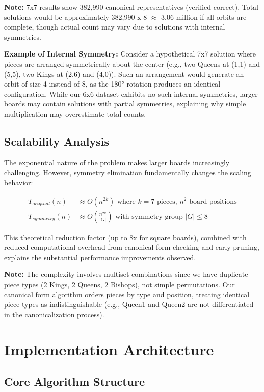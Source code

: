 \documentclass[12pt,a4paper]{article}
\theoremstyle{definition}
\begin{document}
\textbf{Note:} 7x7 results show 382,990 canonical representatives (verified correct). Total solutions would be approximately 382,990 x 8 $\approx$ 3.06 million if all orbits are complete, though actual count may vary due to solutions with internal symmetries.

\textbf{Example of Internal Symmetry:} Consider a hypothetical 7x7 solution where pieces are arranged symmetrically about the center (e.g., two Queens at (1,1) and (5,5), two Kings at (2,6) and (4,0)). Such an arrangement would generate an orbit of size 4 instead of 8, as the 180° rotation produces an identical configuration. While our 6x6 dataset exhibits no such internal symmetries, larger boards may contain solutions with partial symmetries, explaining why simple multiplication may overestimate total counts.

\subsection{Scalability Analysis}

The exponential nature of the problem makes larger boards increasingly challenging. However, symmetry elimination fundamentally changes the scaling behavior:

\begin{align}
T_{original}(n) &\approx O(n^{2k}) \text{ where } k = 7 \text{ pieces, } n^2 \text{ board positions} \\
T_{symmetry}(n) &\approx O\left(\frac{n^{2k}}{|G|}\right) \text{ with symmetry group } |G| \leq 8
\end{align}

This theoretical reduction factor (up to 8x for square boards), combined with reduced computational overhead from canonical form checking and early pruning, explains the substantial performance improvements observed.

\textbf{Note:} The complexity involves multiset combinations since we have duplicate piece types (2 Kings, 2 Queens, 2 Bishops), not simple permutations. Our canonical form algorithm orders pieces by type and position, treating identical piece types as indistinguishable (e.g., Queen1 and Queen2 are not differentiated in the canonicalization process).

\section{Implementation Architecture}

\subsection{Core Algorithm Structure}
\end{document}
